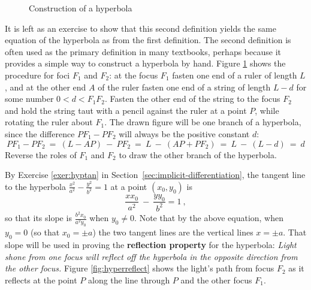 \begin{figure}[h]
\begin{minipage}[b]{7cm}
\begin{center}
\vspace{-4mm}
 \end{center}
 \caption[]{\enskip Construction of a hyperbola}
 \label{fig:drawhyper}
\end{minipage}
\end{figure}\vspace{-2mm}

It is left as an exercise to show that this second definition yields the same
equation of the hyperbola as from the first definition. The second definition
is often used as the primary definition in many textbooks, perhaps because it
provides a simple way to construct a hyperbola by hand. Figure
\ref{fig:drawhyper} shows the procedure for foci $F_1$ and $F_2$: at the focus
$F_1$ fasten one end of a ruler of length $L$, and at the other end $A$ of the
ruler fasten one end of a string of length $L-d$ for some number $0<d<F_1F_2$.
Fasten the other end of the string to the focus $F_2$ and hold the string taut
with a pencil against the ruler at a point $P$, while rotating the ruler about
$F_1$. The drawn figure will be one branch of a hyperbola, since the difference
$PF_1 - PF_2$ will always be the positive constant
$d$:
\[
PF_1 - PF_2 ~=~ (L - AP) ~-~ PF_2 ~=~ L ~-~ (AP + PF_2) ~=~ L ~-~ (L - d) ~=~ d
\]
Reverse the roles of $F_1$ and $F_2$ to draw the other branch of the hyperbola.

By Exercise \ref{exer:hyptan} in Section~\ref{sec:implicit-differentiation}, the tangent
line to the hyperbola $\frac{x^2}{a^2} - \frac{y^2}{b^2} = 1$ at a point
$(x_0,y_0)$ is
\begin{equation}\label{eqn:hypertan}
\frac{x x_0}{a^2} ~-~ \frac{y y_0}{b^2} = 1 ~,
\end{equation}
so that its slope is $\frac{b^2x_0}{a^2y_0}$ when $y_0 \ne 0$. Note that by the
above equation, when $y_0=0$ (so that $x_0=\pm a$) the two tangent lines are the
vertical lines $x=\pm a$.
\newpage
That slope will
be used in proving the \textbf{reflection property} for the hyperbola:
\emph{Light shone from one focus will reflect off the hyperbola in the opposite
direction from the other focus.} Figure \ref{fig:hyperreflect} shows the light's
path from focus $F_2$ as it reflects at the point $P$ along the line through
$P$ and the other focus
$F_1$.

